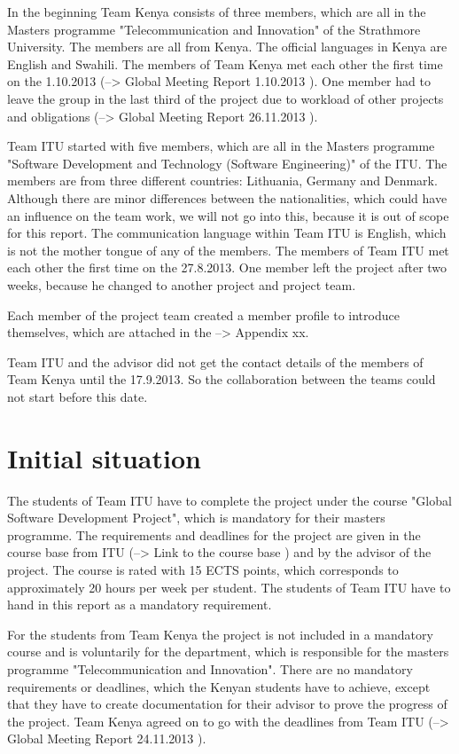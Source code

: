 In the beginning Team Kenya consists of three members, which are all in the Masters programme "Telecommunication and Innovation" of the Strathmore University. The members are all from Kenya. The official languages in Kenya are English and Swahili. The members of Team Kenya met each other the first time on the 1.10.2013 (--> Global Meeting Report 1.10.2013 ). One member had to leave the group in the last third of the project due to workload of other projects and obligations (--> Global Meeting Report 26.11.2013 ).

Team ITU started with five members, which are all in the Masters programme "Software Development and Technology (Software Engineering)" of the ITU. The members are from three different countries: Lithuania, Germany and Denmark. Although there are minor differences between the nationalities, which could have an influence on the team work, we will not go into this, because it is out of scope for this report. The communication language within Team ITU is English, which is not the mother tongue of any of the members. The members of Team ITU met each other the first time on the 27.8.2013. One member left the project after two weeks, because he changed to another project and project team.

Each member of the project team created a member profile to introduce themselves, which are attached in the --> Appendix xx.

Team ITU and the advisor did not get the contact details of the members of Team Kenya until the 17.9.2013. So the collaboration between the teams could not start before this date.


\section{Initial situation}

The students of Team ITU have to complete the project under the course "Global Software Development Project", which is mandatory for their masters programme. The requirements and deadlines for the project are given in the course base from ITU (--> Link to the course base ) and by the advisor of the project. The course is rated with 15 ECTS points, which corresponds to approximately 20 hours per week per student. The students of Team ITU have to hand in this report as a mandatory requirement.

For the students from Team Kenya the project is not included in a mandatory course and is voluntarily for the department, which is responsible for the masters programme "Telecommunication and Innovation". There are no mandatory requirements or deadlines, which the Kenyan students have to achieve, except that they have to create documentation for their advisor to prove the progress of the project. Team Kenya agreed on to go with the deadlines from Team ITU (--> Global Meeting Report 24.11.2013 ).

